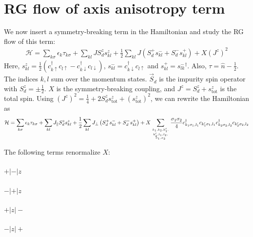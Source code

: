 \documentclass[12pt]{revtex4-2}
\begin{document}
\section{RG flow of axis anisotropy term}
We now insert a symmetry-breaking term in the Hamiltonian and study the RG flow of this term:
\begin{equation}\begin{aligned}
	\mathcal{H} = \sum_{k\sigma}\epsilon_{k}\tau_{k\sigma} + \sum_{kl} J S_d^z s^z_{kl} + \frac{1}{2}\sum_{kl} J \left(S_d^+ s^-_{kl}  + S_d^- s^+_{kl}\right) + X \left(J^z\right)^2
\end{aligned}\end{equation}
Here, \(s^z_{kl} = \frac{1}{2}\left(c^\dagger_{k\uparrow}c_{l \uparrow} - c^\dagger_{k\downarrow}c_{l \downarrow}\right)\), \(s^-_{kl} = c^\dagger_{k \downarrow}c_{l \uparrow}\) and \(s^+_{kl} = {s^-_{lk}}^\dagger\). Also, \(\tau = \hat n - \frac{1}{2}\). The indices \(k,l\) sum over the momentum states. \(\vec S_d\) is the impurity spin operator with \(S_d^z = \pm \frac{1}{2}\). \(X\) is the symmetry-breaking coupling, and \(J^z = S_d^z + s^z_\text{tot}\) is the total spin. Using \(\left(J^z\right)^2 = \frac{1}{4} + 2S_d^z s^z_\text{tot} + \left(s^z_\text{tot}\right)^2 \), we can rewrite the Hamiltonian as
\begin{equation}\begin{aligned}
	\mathcal{H} = \sum_{k\sigma}\epsilon_{k}\tau_{k\sigma} + \sum_{kl} J_\parallel S_d^z s^z_{kl} + \frac{1}{2}\sum_{kl} J_\perp \left(S_d^+ s^-_{kl}  + S_d^- s^+_{kl}\right) + X \sum_{k_1,k_2,k_1^\prime,\atop{k_2^\prime,l_1,l_2,\atop{\sigma_1,\sigma_2}}}\frac{\sigma_1\sigma_2}{4} c^\dagger_{k_1\sigma_1,l_1}c_{k_1^\prime\sigma_1,l_1}c^\dagger_{k_2\sigma_2,l_2}c_{k_2^\prime\sigma_2,l_2}
\end{aligned}\end{equation}

The following terms renormalize \(X\):
\paragraph{\(+|-|z\)}
\paragraph{\(-|+|z\)}
\paragraph{\(+|z|-\)}
\paragraph{\(-|z|+\)}
\end{document}
